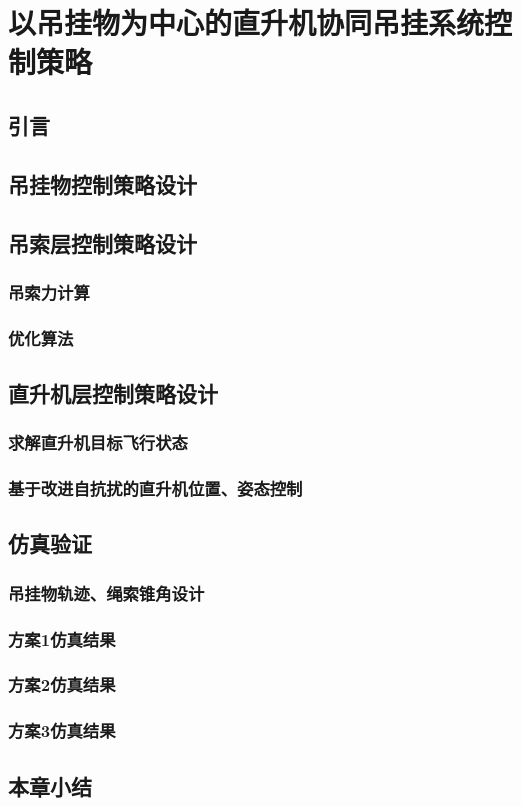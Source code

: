 \chapter{以吊挂物为中心的直升机协同吊挂系统控制策略}
\section{引言}
\section{吊挂物控制策略设计}
\section{吊索层控制策略设计}
\subsection{吊索力计算}
\subsection{优化算法}
\section{直升机层控制策略设计}
\subsection{求解直升机目标飞行状态}
\subsection{基于改进自抗扰的直升机位置、姿态控制}
\section{仿真验证}
\subsection{吊挂物轨迹、绳索锥角设计}
\subsection{方案1仿真结果}
\subsection{方案2仿真结果}
\subsection{方案3仿真结果}
\section{本章小结}
